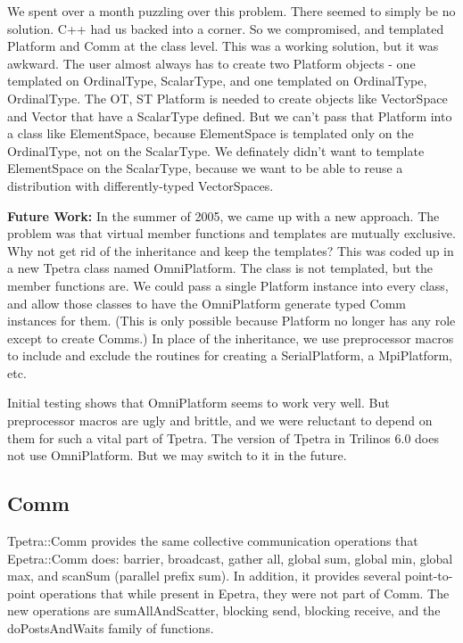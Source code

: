 \documentclass[10pt,relax]{TpetraDesign}
\begin{document}
We spent over a month puzzling over this problem. There seemed to simply be no solution. C++ had us backed into a corner. So we compromised, and templated Platform and Comm at the class level. This was a working solution, but it was awkward. The user almost always has to create two Platform objects - one templated on OrdinalType, ScalarType, and one templated on OrdinalType, OrdinalType. The OT, ST Platform is needed to create objects like VectorSpace and Vector that have a ScalarType defined. But we can't pass that Platform into a class like ElementSpace, because ElementSpace is templated only on the OrdinalType, not on the ScalarType. We definately didn't want to template ElementSpace on the ScalarType, because we want to be able to reuse a distribution with differently-typed VectorSpaces.

\textbf{Future Work:} In the summer of 2005, we came up with a new approach. The problem was that virtual member functions and templates are mutually exclusive. Why not get rid of the inheritance and keep the templates? This was coded up in a new Tpetra class named OmniPlatform. The class is not templated, but the member functions are. We could pass a single Platform instance into every class, and allow those classes to have the OmniPlatform generate typed Comm instances for them. (This is only possible because Platform no longer has any role except to create Comms.) In place of the inheritance, we use preprocessor macros to include and exclude the routines for creating a SerialPlatform, a MpiPlatform, etc. 

Initial testing shows that OmniPlatform seems to work very well. But preprocessor macros are ugly and brittle, and we were reluctant to depend on them for such a vital part of Tpetra. The version of Tpetra in Trilinos 6.0 does not use OmniPlatform. But we may switch to it in the future.

%
\subsection{Comm}
Tpetra::Comm provides the same collective communication operations that Epetra::Comm does: barrier, broadcast, gather all, global sum, global min, global max, and scanSum (parallel prefix sum). In addition, it provides several point-to-point operations that while present in Epetra, they were not part of Comm. The new operations are sumAllAndScatter, blocking send, blocking receive, and the doPostsAndWaits family of functions.
\end{document}
